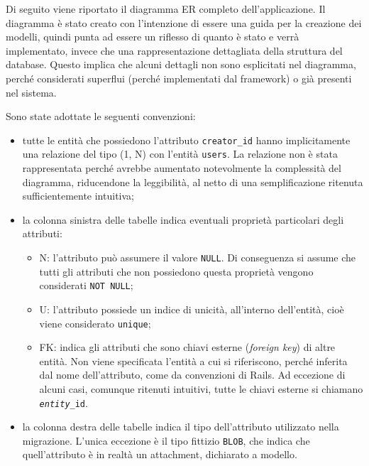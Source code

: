 Di seguito viene riportato il diagramma ER completo dell'applicazione. Il diagramma è stato creato con l'intenzione di essere una guida per la creazione dei modelli, quindi punta ad essere un riflesso di quanto è stato e verrà implementato, invece che una rappresentazione dettagliata della struttura del database. Questo implica che alcuni dettagli non sono esplicitati nel diagramma, perché considerati superflui (perché implementati dal framework) o già presenti nel sistema.

\noindent Sono state adottate le seguenti convenzioni:
\begin{itemize}
	\item tutte le entità che possiedono l'attributo \verb|creator_id| hanno implicitamente una relazione del tipo (1, N) con l'entità \verb|users|. La relazione non è stata rappresentata perché avrebbe aumentato notevolmente la complessità del diagramma, riducendone la leggibilità, al netto di una semplificazione ritenuta sufficientemente intuitiva;
	\item la colonna sinistra delle tabelle indica eventuali proprietà particolari degli attributi:
	\begin{itemize}
		\item N: l'attributo può assumere il valore \verb|NULL|. Di conseguenza si assume che tutti gli attributi che non possiedono questa proprietà vengono considerati \verb|NOT NULL|;
		\item U: l'attributo possiede un indice di unicità, all'interno dell'entità, cioè viene considerato \verb|unique|;
		\item FK: indica gli attributi che sono chiavi esterne (\emph{foreign key}) di altre entità. Non viene specificata l'entità a cui si riferiscono, perché inferita dal nome dell'attributo, come da convenzioni di Rails. Ad eccezione di alcuni casi, comunque ritenuti intuitivi, tutte le chiavi esterne si chiamano \texttt{\emph{entity}\_id}.
	\end{itemize}
	\item la colonna destra delle tabelle indica il tipo dell'attributo utilizzato nella migrazione. L'unica eccezione è il tipo fittizio \verb|BLOB|, che indica che quell'attributo è in realtà un attachment, dichiarato a modello.
\end{itemize}

%
%
